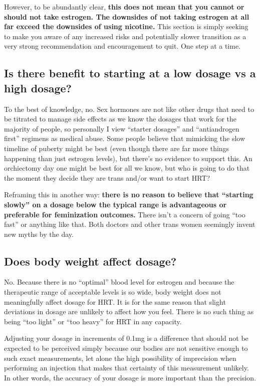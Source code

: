\documentclass{article}
\begin{document}
{{However, to be abundantly clear, \textbf{this does not mean that you cannot or should not take estrogen. The downsides of not taking estrogen at all far exceed the downsides of using nicotine.} This section is simply seeking to make you aware of any increased risks and potentially slower transition as a very strong recommendation and encouragement to quit. One step at a time.

\subsection{Is there benefit to starting at a low dosage vs a high dosage?}

To the best of knowledge, no. Sex hormones are not like other drugs that need to be titrated to manage side effects as we know the dosages that work for the majority of people, so personally I view “starter dosages” and “antiandrogen first” regimens as medical abuse. Some people believe that mimicking the slow timeline of puberty might be best (even though there are far more things happening than just estrogen levels), but there’s no evidence to support this. An orchiectomy day one might be best for all we know, but who is going to do that the moment they decide they are trans and/or want to start HRT?

Reframing this in another way: \textbf{there is no reason to believe that “starting slowly” on a dosage below the typical range is advantageous or preferable for feminization outcomes.} There isn't a concern of going “too fast” or anything like that. Both doctors and other trans women seemingly invent new myths by the day. 

\subsection{Does body weight affect dosage?}

No. Because there is no “optimal” blood level for estrogen and because the therapeutic range of acceptable levels is so wide, body weight does not meaningfully affect dosage for HRT. It is for the same reason that slight deviations in dosage are unlikely to affect how you feel. There is no such thing as being “too light” or “too heavy” for HRT in any capacity.

Adjusting your dosage in increments of 0.1mg is a difference that should not be expected to be perceived simply because our bodies are not sensitive enough to such exact measurements, let alone the high possibility of imprecision when performing an injection that makes that certainty of this measurement unlikely. In other words, the accuracy of your dosage is more important than the precision.

}}
\end{document}
